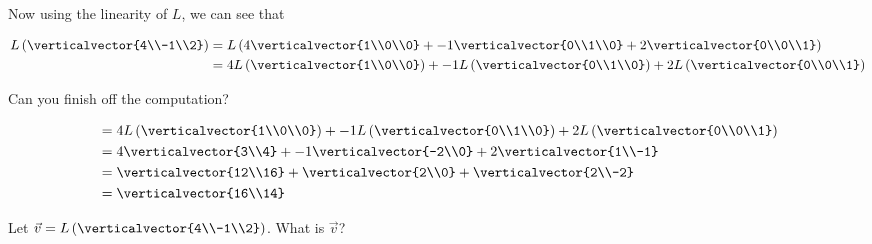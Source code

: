\documentclass{ximera}
\begin{document}
\begin{question}
\begin{solution}
\begin{hint}
  		Now using the linearity of $L$, we can see that 
  		
  		\begin{align*}
  			L\left(\verticalvector{4\\-1\\2}\right) &= L\left( 4\verticalvector{1\\0\\0}+-1\verticalvector{0\\1\\0}+2\verticalvector{0\\0\\1} \right)\\
  			&= 4L\left(\verticalvector{1\\0\\0}\right)+-1L\left(\verticalvector{0\\1\\0}\right)+2L\left(\verticalvector{0\\0\\1}\right)
  		\end{align*}
  		
  		Can you finish off the computation?
  	\end{hint}
  	\begin{hint}
  		\begin{align*}
  			&= 4L\left(\verticalvector{1\\0\\0}\right)+-1L\left(\verticalvector{0\\1\\0}\right)+2L\left(\verticalvector{0\\0\\1}\right)\\
  			&= 4\verticalvector{3\\4}+-1\verticalvector{-2\\0}+2\verticalvector{1\\-1}\\
  			&= \verticalvector{12\\16}+\verticalvector{2\\0}+\verticalvector{2\\-2}\\
  			&= \verticalvector{16\\14}
  		\end{align*}
  	\end{hint}
    Let $\vec{v} = L \left(\verticalvector{4\\-1\\2}\right)$.  What is $\vec{v}$?


\end{solution}
\end{question}
\end{document}
